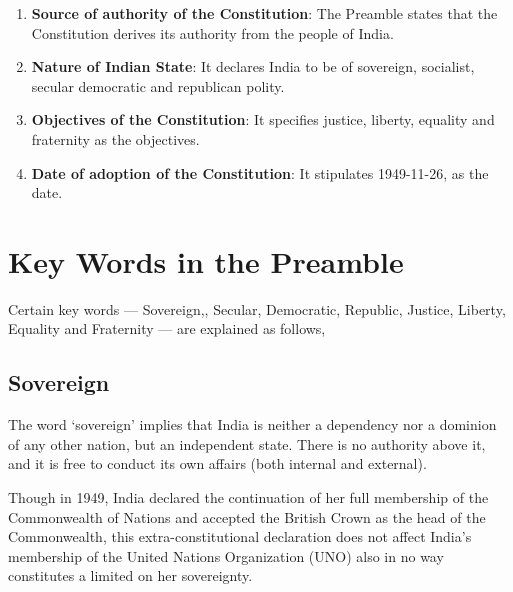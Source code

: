 \begin{enumerate}
  \item \textbf{Source of authority of the Constitution}: The Preamble states that the Constitution derives its authority from the people of India.
  \item \textbf{Nature of Indian State}: It declares India to be of sovereign, socialist, secular democratic and republican polity.
  \item \textbf{Objectives of the Constitution}: It specifies justice, liberty, equality and fraternity as the objectives.
  \item \textbf{Date of adoption of the Constitution}: It stipulates 1949-11-26, as the date.
\end{enumerate}


\section{Key Words in the Preamble}

Certain key words — Sovereign,, Secular, Democratic, Republic, Justice, Liberty, Equality and Fraternity — are explained as follows,

\subsection{Sovereign}

The word `sovereign' implies that India is neither a dependency nor a dominion of any other nation, but an independent state. There is no authority above it, and it is free to conduct its own affairs (both internal and external).

Though in 1949, India declared the continuation of her full membership of the Commonwealth of Nations and accepted the British Crown as the head of the Commonwealth, this extra-constitutional declaration does not affect India's membership of the United Nations Organization (UNO) also in no way constitutes a limited on her sovereignty.

